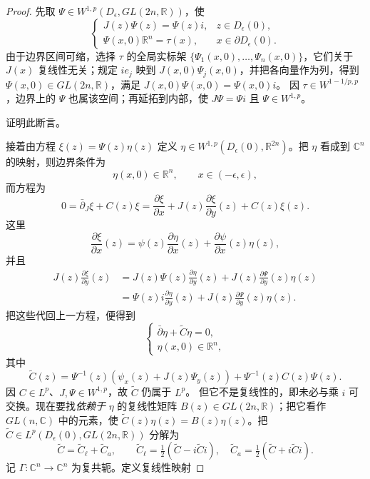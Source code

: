 \begin{proof}
先取
$\Psi\in W^{1,p}(D_\epsilon,GL(2n,\mathbb R))$，使
\[
 \begin{cases}
 J(z)\Psi(z)=\Psi(z)i,&z\in D_\epsilon(0),\\
 \Psi(x,0)\mathbb R^n=\tau(x),&x\in\partial D_\epsilon(0).
 \end{cases}
\]
由于边界区间可缩，选择 $\tau$ 的全局实标架
$\{\Psi_1(x,0),\ldots,\Psi_n(x,0)\}$，它们关于 $J(x)$ 复线性无关；规定
$ie_j$ 映到 $J(x,0)\Psi_j(x,0)$，并把各向量作为列，得到
$\Psi(x,0)\in GL(2n,\mathbb R)$，满足 $J(x,0)\Psi(x,0)=\Psi(x,0)i$。
因 $\tau\in W^{1-1/p,p}$，边界上的 $\Psi$ 也属该空间；再延拓到内部，使
$J\Psi=\Psi i$ 且 $\Psi\in W^{1,p}$。
\begin{exercise}\label{ex:ch8-extend-adapted-frame}证明此断言。\end{exercise}
接着由方程 $\xi(z)=\Psi(z)\eta(z)$ 定义
$\eta\in W^{1,p}(D_\epsilon(0),\mathbb R^{2n})$。把 $\eta$ 看成到
$\mathbb C^n$ 的映射，则边界条件为
\[
 \eta(x,0)\in\mathbb R^n,\qquad x\in(-\epsilon,\epsilon),
\]
而方程为
\[
 0=\bar\partial_J\xi+C(z)\xi
 =\frac{\partial\xi}{\partial x}
 +J(z)\frac{\partial\xi}{\partial y}(z)+C(z)\xi(z).
\]
这里
\[
 \frac{\partial\xi}{\partial x}(z)
 =\psi(z)\frac{\partial\eta}{\partial x}(z)
 +\frac{\partial\psi}{\partial x}(z)\eta(z),
\]
并且
\begin{align*}
 J(z)\frac{\partial\xi}{\partial y}(z)
 &=J(z)\Psi(z)\frac{\partial\eta}{\partial y}(z)
   +J(z)\frac{\partial\Psi}{\partial y}(z)\eta(z)\\
 &=\Psi(z)i\frac{\partial\eta}{\partial y}(z)
   +J(z)\frac{\partial\Psi}{\partial y}(z)\eta(z).
\end{align*}
把这些代回上一方程，便得到
\[
 \begin{cases}
 \bar\partial\eta+\widetilde C\eta=0,\\
 \eta(x,0)\in\mathbb R^n,
 \end{cases}
\]
其中
\[
 \widetilde C(z)=\Psi^{-1}(z)
 \left(\psi_x(z)+J(z)\Psi_y(z)\right)+\Psi^{-1}(z)C(z)\Psi(z).
\]
因 $C\in L^p$、$J,\Psi\in W^{1,p}$，故 $\widetilde C$ 仍属于 $L^p$。
但它不是复线性的，即未必与乘 $i$ 可交换。现在要找\emph{依赖于} $\eta$ 的复线性矩阵
$B(z)\in GL(2n,\mathbb R)$；把它看作 $GL(n,\mathbb C)$ 中的元素，使
$\widetilde C(z)\eta(z)=B(z)\eta(z)$。把
$\widetilde C\in L^p(D_\epsilon(0),GL(2n,\mathbb R))$ 分解为
\[
 \widetilde C=\widetilde C_\ell+\widetilde C_a,\qquad
 \widetilde C_\ell=\tfrac12(\widetilde C-i\widetilde C i),\quad
 \widetilde C_a=\tfrac12(\widetilde C+i\widetilde C i).
\]
记 $\Gamma:\mathbb C^n\to\mathbb C^n$ 为复共轭。定义复线性映射

\end{proof}

